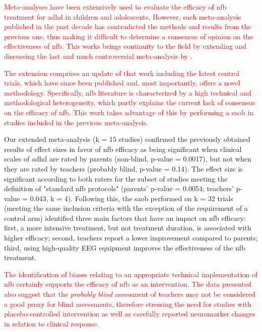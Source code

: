 

\textcolor{red}{\noindent Meta-analyses have been extensively used to
evaluate the efficacy of \gls{nfb} treatment for \gls{adhd} in children and adolescents. 
However, each meta-analysis published in the past decade has contradicted the methods and
results from the previous one, thus making it difficult to determine a consensus of opinion
on the effectiveness of \gls{nfb}. This works brings continuity to the field by extending and discussing the last and much 
controversial meta-analysis by} \citet{Cortese2016}. 

\textcolor{red}{The extension comprises an update of that work including the latest control trials, 
which have since been published and, most importantly, offers a
novel methodology. Specifically, \gls{nfb} literature is characterized 
by a high technical and methodological heterogeneity, which partly explains the current lack of consensus on 
the efficacy of \gls{nfb}. This work takes advantage of this by performing a \gls{saob} in studies included in the previous meta-analysis.}

Our extended meta-analysis (k = 15 studies) confirmed the previously
obtained results of effect sizes in favor of \gls{nfb} efficacy as being significant when clinical scales of \gls{adhd}
are rated by parents (non-blind, p-value = 0.0017), but not when they are rated by
teachers (probably blind, p-value = 0.14). The effect size is significant
according to both raters for the subset of studies meeting the definition of
"standard \gls{nfb} protocols" (parents' p-value = 0.0054; teachers' p-value = 0.043, k
= 4). Following this, the \gls{saob} performed on k = 32 trials (meeting the same inclusion
criteria with the exception of the requirement of a control arm)
identified three main factors that have an impact on \gls{nfb} efficacy: first, a more
intensive treatment, but not treatment duration, is associated with higher
efficacy; second, teachers report a lower improvement compared to parents;
third, using high-quality EEG equipment improves the effectiveness of the \gls{nfb} treatment.

\textcolor{red}{The identification of biases relating to an appropriate technical implementation of \gls{nfb} 
certainly supports the efficacy of \gls{nfb} as an
intervention. The data presented also suggest that the \emph{probably blind} assessment of teachers may not
be considered a good proxy for blind assessments, therefore stressing the need for studies with placebo-controlled
intervention as well as carefully reported neuromarker changes in relation to
clinical response.}



